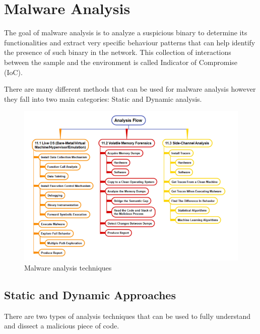 
\chapter{Malware Analysis}
\label{chap:2}


The goal of malware analysis is to analyze a suspicious binary to determine its functionalities and extract very specific behaviour patterns that can help identify the presence of such binary in the network. This collection of interactions between the sample and the environment is called Indicator of Compromise (IoC).

There are many different methods that can be used for malware analysis however they fall into two main categories: Static and Dynamic analysis. 

\noindent
\begin{figure}[htp]
\centering
\includegraphics[width=\linewidth]{images/dynanalysis.png}
\caption{Malware analysis techniques}
\label{fig:mat}
\end{figure}

\section{Static and Dynamic Approaches}
There are two types of analysis techniques that can be used to fully understand and dissect a malicious piece of code.

